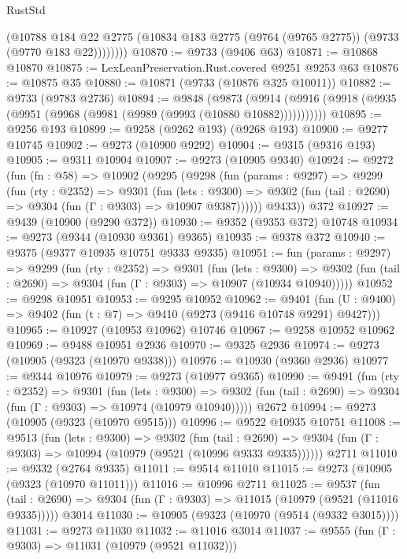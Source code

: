 \begin{lexlean}{RustStd}
\begin{coremodule}
{\begin{coremodule}
{{{{{{{{{{{{{{{{{{{{{{{{{{{{{{{{{{{{{{{{{{{{{{{{{{{{{{{            (@10788
              @184
              @22
              @2775
              (@10834 @183 @2775 (@9764 (@9765 @2775)) (@9733 (@9770 @183 @22))))))))
@10870 := @9733 (@9406 @63)
@10871 := @10868 @10870
@10875 := LexLeanPreservation.Rust.covered @9251 @9253 @63
@10876 := @10875 @35
@10880 := @10871 (@9733 (@10876 @325 @10011))
@10882 := @9733 (@9783 @2736)
@10894 := @9848
    (@9873 (@9914 (@9916 (@9918 (@9935 (@9951 (@9968 (@9981 (@9989 (@9993 (@10880 @10882)))))))))))
@10895 := @9256 @193
@10899 := @9258 (@9262 @193) (@9268 @193)
@10900 := @9277 @10745
@10902 := @9273 (@10900 @9292)
@10904 := @9315 (@9316 @193)
@10905 := @9311 @10904
@10907 := @9273 (@10905 @9340)
@10924 := @9272
    (fun (fn : @58) =>
    @10902
      (@9295
        (@9298
          (fun (params : @9297) =>
          @9299
            (fun (rty : @2352) =>
            @9301
              (fun (lets : @9300) =>
              @9302 (fun (tail : @2690) => @9304 (fun (Γ : @9303) => @10907 @9387))))))
        @9433))
    @372
@10927 := @9439 (@10900 (@9290 @372))
@10930 := @9352 (@9353 @372) @10748
@10934 := @9273 (@9344 (@10930 @9361) @9365)
@10935 := @9378 @372
@10940 := @9375 (@9377 @10935 @10751 @9333 @9335)
@10951 := fun (params : @9297) =>
  @9299
    (fun (rty : @2352) =>
    @9301
      (fun (lets : @9300) =>
      @9302 (fun (tail : @2690) => @9304 (fun (Γ : @9303) => @10907 (@10934 @10940)))))
@10952 := @9298 @10951
@10953 := @9295 @10952
@10962 := @9401
    (fun (U : @9400) => @9402 (fun (t : @7) => @9410 (@9273 (@9416 @10748 @9291) @9427)))
@10965 := @10927 (@10953 @10962) @10746
@10967 := @9258 @10952 @10962
@10969 := @9488 @10951 @2936
@10970 := @9325 @2936
@10974 := @9273 (@10905 (@9323 (@10970 @9338)))
@10976 := @10930 (@9360 @2936)
@10977 := @9344 @10976
@10979 := @9273 (@10977 @9365)
@10990 := @9491
    (fun (rty : @2352) =>
    @9301
      (fun (lets : @9300) =>
      @9302 (fun (tail : @2690) => @9304 (fun (Γ : @9303) => @10974 (@10979 @10940)))))
    @2672
@10994 := @9273 (@10905 (@9323 (@10970 @9515)))
@10996 := @9522 @10935 @10751
@11008 := @9513
    (fun (lets : @9300) =>
    @9302
      (fun (tail : @2690) =>
      @9304 (fun (Γ : @9303) => @10994 (@10979 (@9521 (@10996 @9333 @9335))))))
    @2711
@11010 := @9332 (@2764 @9335)
@11011 := @9514 @11010
@11015 := @9273 (@10905 (@9323 (@10970 @11011)))
@11016 := @10996 @2711
@11025 := @9537
    (fun (tail : @2690) => @9304 (fun (Γ : @9303) => @11015 (@10979 (@9521 (@11016 @9335)))))
    @3014
@11030 := @10905 (@9323 (@10970 (@9514 (@9332 @3015))))
@11031 := @9273 @11030
@11032 := @11016 @3014
@11037 := @9555 (fun (Γ : @9303) => @11031 (@10979 (@9521 @11032)))
}}}}}}}}}}}}}}}}}}}}}}}}}}}}}}}}}}}}}}}}}}}}}}}}}}}}}}}
\end{coremodule}}
\end{coremodule}
\end{lexlean}
